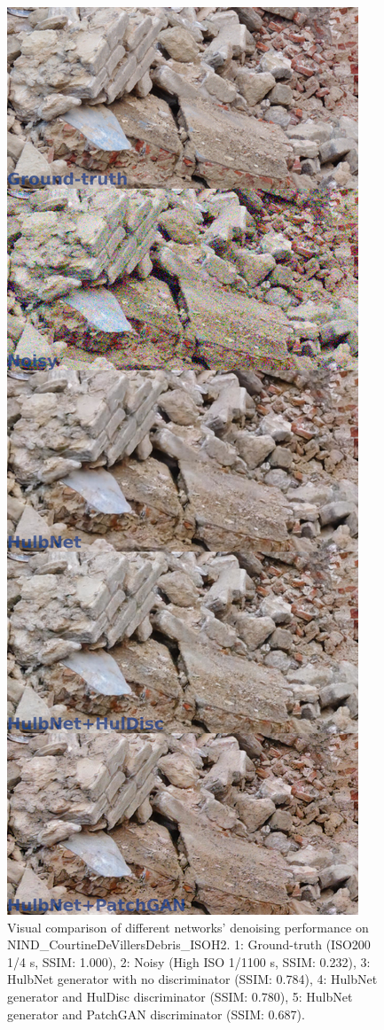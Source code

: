 \begin{figure}[!htbp]
\centering
\includegraphics[width=1\linewidth,height=0.85\textheight,keepaspectratio]{gfx/comp/NIND_CourtineDeVillersDebris_ISOH2-cgan.jpg}
\caption[Denoising CourtineDeVillersDebris with cGANs (visual comparison)]{Visual comparison of different networks' denoising performance on NIND\_CourtineDeVillersDebris\_ISOH2. 1: Ground-truth (ISO200 1/4 s, SSIM: 1.000), 2: Noisy (High ISO 1/1100 s, SSIM: 0.232), 3: HulbNet generator with no discriminator (SSIM: 0.784), 4: HulbNet generator and HulDisc discriminator (SSIM: 0.780), 5: HulbNet generator and PatchGAN discriminator (SSIM: 0.687).}
\label{fig:cgan-wall}
\end{figure}

